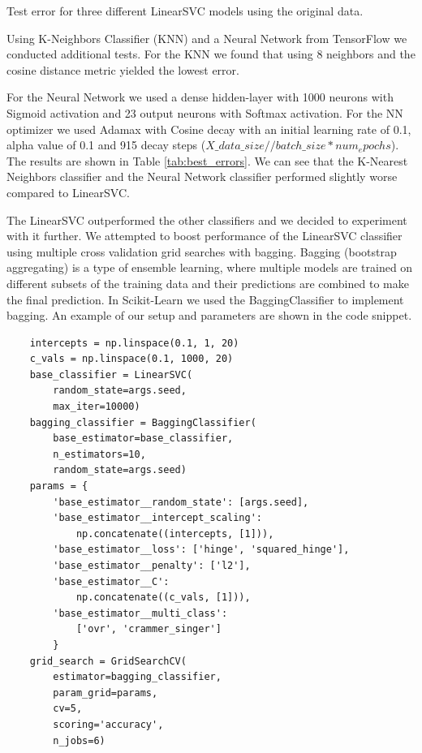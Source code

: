 \begin{table}[!ht]
\centering
\caption{Test error for three different LinearSVC models using the original data.}

\label{tab:lsvc_errors}
\end{table}

Using K-Neighbors Classifier (KNN) and a Neural Network from TensorFlow we conducted additional tests. For the KNN we found that using 8 neighbors and the cosine distance metric yielded the lowest error. 

For the Neural Network we used a dense hidden-layer with 1000 neurons with Sigmoid activation and 23 output neurons with Softmax activation. For the NN optimizer we used Adamax with Cosine decay with an initial learning rate of 0.1, alpha value of 0.1 and 915 decay steps ($X\_data\_size // batch\_size * num_epochs$). The results are shown in Table \ref{tab:best_errors}. We can see that the K-Nearest Neighbors classifier and the Neural Network classifier performed slightly worse compared to LinearSVC.

The LinearSVC outperformed the other classifiers and we decided to experiment with it further. We attempted to boost performance of the LinearSVC classifier using multiple cross validation grid searches with bagging. Bagging (bootstrap aggregating) is a type of ensemble learning, where multiple models are trained on different subsets of the training data and their predictions are combined to make the final prediction. In Scikit-Learn we used the BaggingClassifier to implement bagging. An example of our setup and parameters are shown in the code snippet. 

\begin{verbatim}
    intercepts = np.linspace(0.1, 1, 20)
    c_vals = np.linspace(0.1, 1000, 20)
    base_classifier = LinearSVC(
        random_state=args.seed, 
        max_iter=10000)
    bagging_classifier = BaggingClassifier(
        base_estimator=base_classifier, 
        n_estimators=10, 
        random_state=args.seed)
    params = {
        'base_estimator__random_state': [args.seed],
        'base_estimator__intercept_scaling': 
            np.concatenate((intercepts, [1])),
        'base_estimator__loss': ['hinge', 'squared_hinge'],
        'base_estimator__penalty': ['l2'],
        'base_estimator__C': 
            np.concatenate((c_vals, [1])),
        'base_estimator__multi_class': 
            ['ovr', 'crammer_singer']
        }
    grid_search = GridSearchCV(
        estimator=bagging_classifier, 
        param_grid=params, 
        cv=5,
        scoring='accuracy',
        n_jobs=6)
\end{verbatim}

